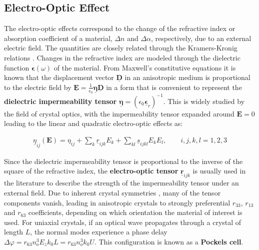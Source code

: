 \subsection{Electro-Optic Effect}
The electro-optic effects correspond to the change of the refractive index or absorption coefficient of a material, $\Delta n$ and $\Delta \alpha$, respectively, due to an external electric field. The quantities are closely related through the Kramers-Kronig relations \cite{OEDakin06}. Changes in the refractive index are modeled through the dielectric function $\mathbf{\epsilon}(\omega)$ of the material. From Maxwell's constitutive equations it is known that the displacement vector $\underline{\textbf{D}}$ in an anisotropic medium is proportional to the electric field by $\underline {\mathbf{E}} = \frac{1}{\epsilon_0} \underline{\mathbf{\eta}} \underline{\mathbf{D}}$ in a form that is convenient to represent the \textbf{dielectric impermeability tensor} $\underline{\mathbf{\eta}}= (\epsilon_0 \underline{\mathbf{\epsilon}}_r)^{-1}$. This is widely studied by the field of crystal optics, with the impermeability tensor expanded around $\mathbf{E}=0$ leading to the linear and quadratic electro-optic effects \cite{PhotoSaleh91} as:




\begin{align}
\underline \eta_{ij} (\mathbf{E}) = \eta_{ij} + \sum_k \underline r_{ijk} E_k + \sum_{kl} \underline s_{ijkl} E_k E_l, \qquad i,j,k,l=1,2,3
 \end{align}

Since the dielectric impermeability tensor is proportional to the inverse of the square of the refractive index, the \textbf{electro-optic tensor} $\underline{\mathbf{r}}_{ijk}$ is usually used in the literature to describe the strength of the impermeability tensor under an external field. Due to inherent crystal symmetries \cite{BoydNLO08}, many of the tensor components vanish, leading in anisotropic crystals to strongly preferential $r_{33}$, $r_{13}$ and $r_{63}$ coefficients, depending on which orientation the material of interest is used. For uniaxial crystals, if an optical wave propagates through a crystal of length $L$, the normal modes experience a phase delay $\Delta \varphi = r_{63}n_o^3E_z k_0 L = r_{63}n_o^3 k_0 U$. This configuration is known as a \textbf{Pockels cell}. 


